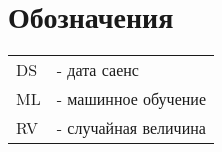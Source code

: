 \chapter*{Обозначения}

\begin{tabular}{ l l }
 DS & - дата саенс \\ 
 ML & - машинное обучение \\ 
 RV & - случайная величина
\end{tabular}
